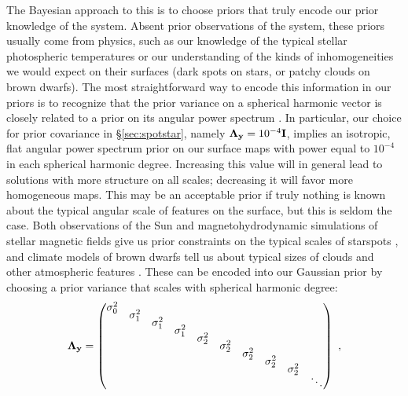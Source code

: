 \documentclass[modern]{aastex631}
\begin{document}
The Bayesian approach to this is to choose priors that truly encode our prior knowledge of the system. 
Absent prior observations of the system, these priors usually come from physics, such as our knowledge of the typical stellar photospheric temperatures or our understanding of the kinds of inhomogeneities we would expect on their surfaces (dark spots on stars, or patchy clouds on brown dwarfs). 
The most straightforward way to encode this information in our priors is to recognize that the prior variance on a spherical harmonic vector is closely related to a prior on its angular power spectrum \citep[see, e.g.,][]{Baldi2006,Wandelt2012}.
In particular, our choice for prior covariance in \S\ref{sec:spotstar}, namely $\boldsymbol{\Lambda}_{\mathbf{y}} = 10^{-4}{\mathbf{I}}$, implies an isotropic, flat angular power spectrum prior on our surface maps with power equal to $10^{-4}$ in each spherical harmonic degree.
Increasing this value will in general lead to solutions with more structure on all scales; decreasing it will favor more homogeneous maps.
This may be an acceptable prior if truly nothing is known about the typical angular scale of features on the surface, but this is seldom the case.
Both observations of the Sun and magnetohydrodynamic simulations of stellar magnetic fields give us prior constraints on the typical scales of starspots , and climate models of brown dwarfs tell us about typical sizes of clouds and other atmospheric features \citep[e.g.,][]{Tan2019,Tan2020,Tan2021a,Tan2021b}.
These can be encoded into our Gaussian prior by choosing a prior variance that scales with spherical harmonic degree:
%
\begin{align}
    \boldsymbol{\Lambda}_{\mathbf{y}} = 
    \begin{pmatrix}
        \sigma_0^2 & & & & & & & & & \\[-0.5em]
        & \sigma_1^2 & & & & & & & & \\[-0.5em]
        & & \sigma_1^2 & & & & & & & \\[-0.5em]
        & & & \sigma_1^2 & & & & & & \\[-0.5em]
        & & & & \sigma_2^2 & & & & & \\[-0.5em]
        & & & & & \sigma_2^2 & & & & \\[-0.5em]
        & & & & & & \sigma_2^2 & & & \\[-0.5em]
        & & & & & & & \sigma_2^2 & & \\[-0.5em]
        & & & & & & & & \sigma_2^2 & \\[-0.5em]
        & & & & & & & & & \ddots
    \end{pmatrix}
    \hskip 0.33em,
\end{align}
\end{document}
